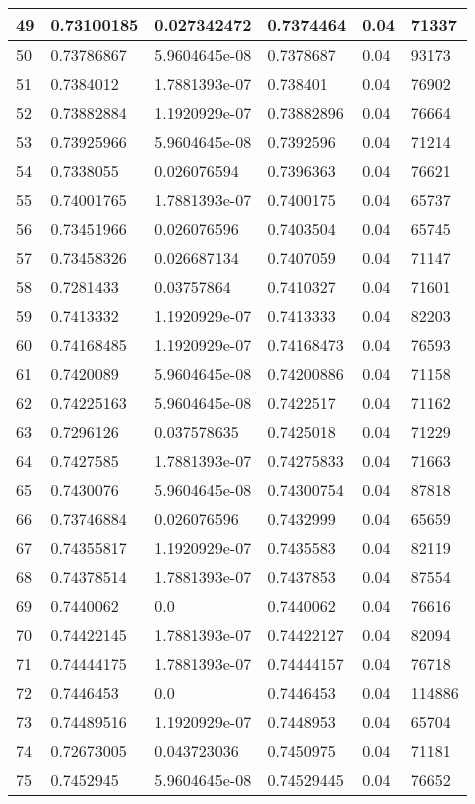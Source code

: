 \begin{longtable}{|l|l|l|l|l|l|}
49 & 0.73100185 & 0.027342472 & 0.7374464 & 0.04 & 71337 \\ \hline 
50 & 0.73786867 & 5.9604645e-08 & 0.7378687 & 0.04 & 93173 \\ \hline 
51 & 0.7384012 & 1.7881393e-07 & 0.738401 & 0.04 & 76902 \\ \hline 
52 & 0.73882884 & 1.1920929e-07 & 0.73882896 & 0.04 & 76664 \\ \hline 
53 & 0.73925966 & 5.9604645e-08 & 0.7392596 & 0.04 & 71214 \\ \hline 
54 & 0.7338055 & 0.026076594 & 0.7396363 & 0.04 & 76621 \\ \hline 
55 & 0.74001765 & 1.7881393e-07 & 0.7400175 & 0.04 & 65737 \\ \hline 
56 & 0.73451966 & 0.026076596 & 0.7403504 & 0.04 & 65745 \\ \hline 
57 & 0.73458326 & 0.026687134 & 0.7407059 & 0.04 & 71147 \\ \hline 
58 & 0.7281433 & 0.03757864 & 0.7410327 & 0.04 & 71601 \\ \hline 
59 & 0.7413332 & 1.1920929e-07 & 0.7413333 & 0.04 & 82203 \\ \hline 
60 & 0.74168485 & 1.1920929e-07 & 0.74168473 & 0.04 & 76593 \\ \hline 
61 & 0.7420089 & 5.9604645e-08 & 0.74200886 & 0.04 & 71158 \\ \hline 
62 & 0.74225163 & 5.9604645e-08 & 0.7422517 & 0.04 & 71162 \\ \hline 
63 & 0.7296126 & 0.037578635 & 0.7425018 & 0.04 & 71229 \\ \hline 
64 & 0.7427585 & 1.7881393e-07 & 0.74275833 & 0.04 & 71663 \\ \hline 
65 & 0.7430076 & 5.9604645e-08 & 0.74300754 & 0.04 & 87818 \\ \hline 
66 & 0.73746884 & 0.026076596 & 0.7432999 & 0.04 & 65659 \\ \hline 
67 & 0.74355817 & 1.1920929e-07 & 0.7435583 & 0.04 & 82119 \\ \hline 
68 & 0.74378514 & 1.7881393e-07 & 0.7437853 & 0.04 & 87554 \\ \hline 
69 & 0.7440062 & 0.0 & 0.7440062 & 0.04 & 76616 \\ \hline 
70 & 0.74422145 & 1.7881393e-07 & 0.74422127 & 0.04 & 82094 \\ \hline 
71 & 0.74444175 & 1.7881393e-07 & 0.74444157 & 0.04 & 76718 \\ \hline 
72 & 0.7446453 & 0.0 & 0.7446453 & 0.04 & 114886 \\ \hline 
73 & 0.74489516 & 1.1920929e-07 & 0.7448953 & 0.04 & 65704 \\ \hline 
74 & 0.72673005 & 0.043723036 & 0.7450975 & 0.04 & 71181 \\ \hline 
75 & 0.7452945 & 5.9604645e-08 & 0.74529445 & 0.04 & 76652 \\ \hline 
\end{longtable}